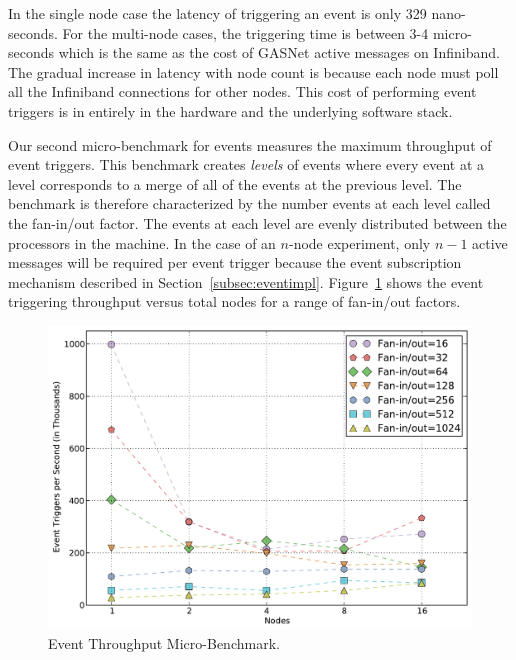 In the single node case the latency of triggering an event is only 
329 nano-seconds.  For the multi-node cases, the triggering time is
between 3-4 micro-seconds which is the same as the cost of GASNet
active messages on Infiniband\cite{GASNET07}.  The gradual increase in latency with
node count is because each node must poll all the Infiniband connections for other nodes.
This cost of performing event triggers is in entirely in the hardware and the underlying software stack.

Our second micro-benchmark for events measures the maximum throughput of event
triggers.  This benchmark creates {\em levels} of events where every event at a level
corresponds to a merge of all of the events at the previous level.  The benchmark is therefore
characterized by the number events at each level called the fan-in/out factor.  
The events at each level are evenly distributed between the processors in the machine.
In the case of an $n$-node experiment, only $n-1$ active messages will be required 
per event trigger because the event subscription mechanism described in 
Section~\ref{subsec:eventimpl}.  Figure~\ref{fig:eventthroo} shows the event triggering
throughput versus total nodes for a range of fan-in/out factors.

\begin{figure}
\begin{center}
\includegraphics[scale=0.33]{figs/event_throughput.pdf}
\end{center}
\vspace{-6mm}
\caption{Event Throughput Micro-Benchmark.\label{fig:eventthroo}}
\vspace{-4mm}
\end{figure}

